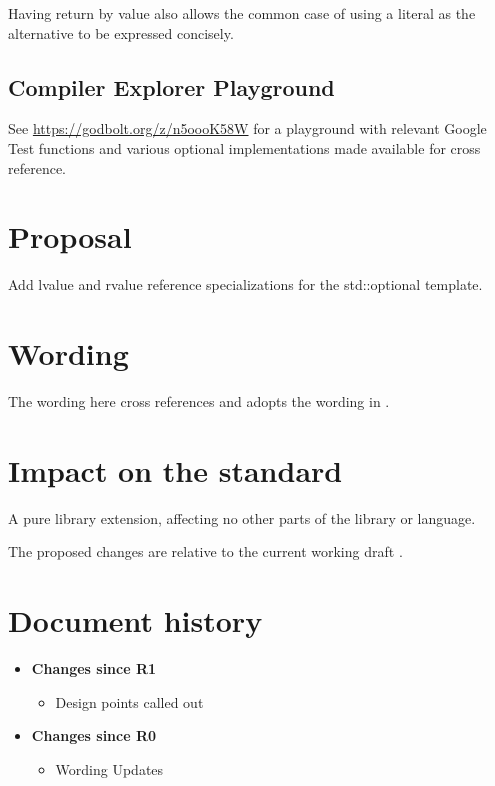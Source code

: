 \documentclass[a4paper,10pt,oneside,openany,final,article]{memoir}
\begin{document}
Having  return by value also allows the common case of using a literal as the alternative to be expressed concisely.

\section{Compiler Explorer Playground}

See \url{https://godbolt.org/z/n5oooK58W} for a playground with relevant Google Test functions and various optional implementations made available for cross reference.

\chapter{Proposal}

Add lvalue and rvalue reference specializations for the std::optional template.

\chapter{Wording}

The wording here cross references and adopts the wording in \cite{P3091R2}.


\begin{wording}



\end{wording}

\chapter{Impact on the standard}

A pure library extension, affecting no other parts of the library or language.

The proposed changes are relative to the current working draft \cite{N4910}.

\chapter*{Document history}

\begin{itemize}
\item \textbf{Changes since R1}
  \begin{itemize}
  \item Design points called out
  \end{itemize}
\item \textbf{Changes since R0}
  \begin{itemize}
  \item Wording Updates
  \end{itemize}
\end{itemize}
\end{document}
